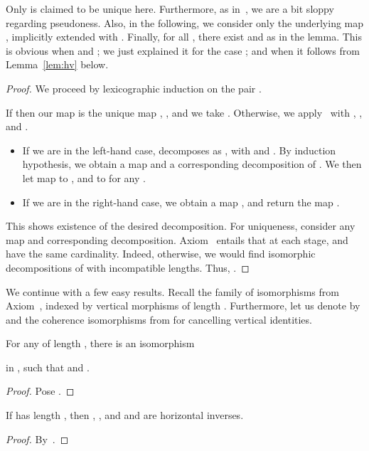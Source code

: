 \documentclass{LMCS}
\theoremstyle{plain}\newtheorem{satz}[thm]{Satz}
\begin{document}
\begin{rem}
  Only  is claimed to be unique here.  Furthermore, as
  in~, we are a bit sloppy regarding pseudoness.
  Also, in the following, we consider only the underlying map , implicitly extended with .  Finally, for
  all , there exist  and
   as in the lemma. This is obvious when  and ;
  we just explained it for the case ; and when  it follows
  from Lemma~\ref{lem:hv} below.
\end{rem}
\begin{proof}
  We proceed by lexicographic induction on the pair .  

  If  then our map  is the unique map , , and we take .  Otherwise, we apply~ with ,
  ,  and
  .
    \begin{itemize}
    \item If we are in the left-hand case,  decomposes as
      , with 
      and .  By induction hypothesis,
      we obtain a map  and a
      corresponding decomposition of .  We then let
       map  to , and  to
       for any .
    \item If we are in the right-hand case, we obtain a map
      , and return the map .
    \end{itemize}
    This shows existence of the desired decomposition. For uniqueness,
    consider any map  and corresponding
    decomposition.  Axiom~ entails that at
    each stage,  and
     have the same cardinality. Indeed,
    otherwise, we would find isomorphic decompositions of  with incompatible lengths.  Thus, .
\end{proof}

We continue with a few easy results.  Recall the family of isomorphisms
 from Axiom~, indexed by vertical morphisms
of length .  Furthermore, let us denote by  and  the
coherence isomorphisms from  for cancelling vertical identities.
\begin{lem}\label{lem:alphau}
  For any  of length , there is an isomorphism
  \begin{mathpar}
  \end{mathpar}
  in , such that  and .
\end{lem}
\begin{proof}
  Pose .
\end{proof}
\begin{lem}\label{lem:hv}
  If  has length , then , , and  and  are horizontal inverses.
\end{lem}
\begin{proof}
  By~.
\end{proof}
\end{document}
